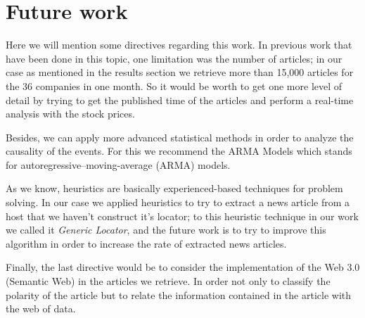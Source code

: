 \section{Future work}

Here we will mention some directives regarding this work. In previous work that have been done in this topic, one limitation was the number of articles; in our case as mentioned in the results section we retrieve more than 15,000 articles for the 36 companies in one month. So it would be worth to get one more level of detail by trying to get the published time of the articles and perform a real-time analysis with the stock prices.

Besides, we can apply more advanced statistical methods in order to analyze the causality of the events. For this we recommend the ARMA Models which stands for autoregressive–moving-average (ARMA) models.

As we know, heuristics are basically experienced-based techniques for problem solving. In our case we applied heuristics to try to extract a news article from a host that we haven't construct it's locator; to this heuristic technique in our work we called it \emph{Generic Locator}, and the future work is to try to improve this algorithm in order to increase the rate of extracted news articles.

Finally, the last directive would be to consider the implementation of the Web 3.0 (Semantic Web) in the articles we retrieve. In order not only to classify the polarity of the article but to relate the information contained in the article with the web of data.